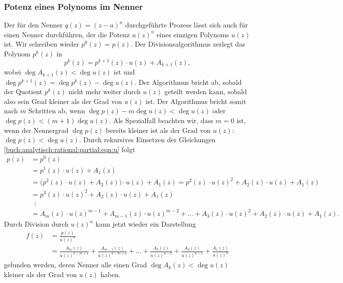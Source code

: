 %
%
\subsubsection{Potenz eines Polynoms im Nenner}
Der für den Nenner $q(z) = (z-a)^n$ durchgeführte Prozess lässt sich
auch für einen Nenner durchführen, der die Potenz $u(z)^n$ eines
einzigen Polynoms $u(z)$ ist.
Wir schreiben wieder $p^0(z)=p(z)$.
Der Divisionsalgorithmus zerlegt das Polynom $p^k(z)$ in 
\begin{equation}
p^k(z)
=
p^{k+1}(z)\cdot u(z) + A_{k+1}(z),
\label{buch:analytisch:rational:partial:eqn:u}
\end{equation}
wobei $\deg A_{k+1}(z)<\deg u(z)$ ist und
$\deg p^{k+1}(z) = \deg p^{k}(z)-\deg u(z)$.
Der Algorithmus bricht ab, sobald der Quotient $p^k(z)$ nicht
mehr weiter durch $u(z)$ geteilt werden kann, sobald also
sein Grad kleiner als der Grad von $u(z)$ ist.
Der Algorithmus bricht somit nach $m$ Schritten ab, wenn
$\deg p(z) - m\deg u(z) < \deg u(z)$ oder
$\deg p(z) < (m+1) \deg u(z)$.
Als Spezialfall beachten wir, dass $m=0$ ist, wenn der Nennergrad
$\deg p(z)$ bereits kleiner ist als der Grad von
$u(z)$: $\deg p(z) < \deg u(z)$.
Durch rekursives Einsetzen der Gleichungen
\eqref{buch:analytisch:rational:partial:eqn:u}
folgt
\begin{align*}
p(z)
&=
p^0(z)
\\
&=
p^1(z)\cdot u(z) + A_1(z)
\\
&=
\bigl(
p^2(z)\cdot u(z) + A_2(z)
\bigr)\cdot u(z) + A_1(z)
=
p^2(z)\cdot u(z)^2 + A_2(z) \cdot u(z) + A_1(z)
\\
&=
p^3(z)\cdot u(z)^2 + A_2(z)\cdot u(z) + A_1(z)
\\[-2pt]
&\phantom{a}\vdots
\\
&=
A_m(z)\cdot u(z)^{m-1} + A_{m-1}(z)\cdot u(z)^{m-2}
+
\ldots
+
A_3(z)\cdot u(z)^2 + A_2(z)\cdot u(z) + A_1(z).
\end{align*}
Durch Division durch $u(z)^n$ kann jetzt wieder ein Darstellung
\begin{align*}
f(z)
&=
\frac{p(z)}{u(z)^n}
\\
&=
\frac{A_m(z)}{u(z)^{n-m+1}}
+
\frac{A_{m-1}(z)}{u(z)^{n-m+2}}
+
\ldots
+
\frac{A_3(z)}{u(z)^{n-2}}
+
\frac{A_2(z)}{u(z)^{n-1}}
+
\frac{A_1(z)}{u(z)^n}
\end{align*}
gefunden werden, deren Nenner alle einen Grad $\deg A_k(z)<\deg u(z)$ 
kleiner als der Grad von $u(z)$ haben.

%
%

